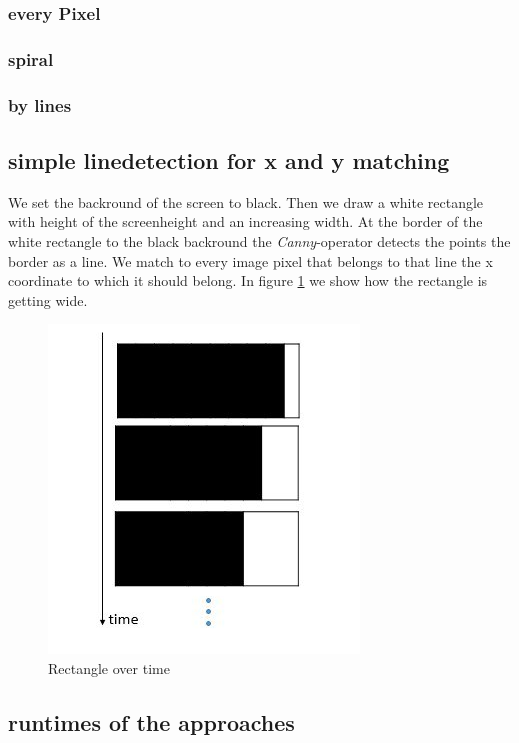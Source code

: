 \documentclass[journal,final,a4paper,twoside]{PS}
\begin{document}
\subsubsection{every Pixel}
\subsubsection{spiral}
\subsubsection{by lines}
\subsection{simple linedetection for x and y matching}
We set the backround of the screen to black. Then we draw a white rectangle with height of the screenheight and an increasing width. At the border of the white rectangle to the black backround the \emph{Canny}-operator detects the points the border as a line. We match to every image pixel that belongs to that line the x coordinate to which it should belong. In figure \ref{fig:blockOverTime} we show how the rectangle is getting wide.
\\

\begin{figure}[h]
\begin{center}
\includegraphics[scale=0.8]{./pics/blockOverTime.jpg}
\caption{Rectangle over time}
\label{fig:blockOverTime}
\end{center}
\end{figure}

\subsection{runtimes of the approaches}
\label{sec:runtime}
\end{document}
